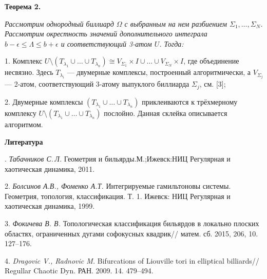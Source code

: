 \textbf{Теорема 2.} {\it
	Рассмотрим однородный биллиард $\Omega$ с выб\-ран\-ным на нем разбиением $\Sigma_1, \ldots, \Sigma_N$. Рассмотрим окрест\-ность значений дополнительного интеграла $b - \epsilon \leq \Lambda \leq b + \epsilon$ и соответствующий 3-атом $U$. Тогда:

1. Комплекс $U \setminus (T_{\lambda_1}\cup\ldots\cup T_{\lambda_n}) \cong V_{\Sigma_1} \times I \cup \ldots \cup V_{\Sigma_N} \times I$, где объединение несвязно. Здесь $T_{\lambda_i}$ --- двумерные комплексы, построенный алгорит\-мически, а $V_{\Sigma_j}$ --- 2-атом, соот\-вет\-ствующий 3-атому выпуклого бил\-лиарда $\Sigma_j$, см. [3];

2. Двумерные комплексы $(T_{\lambda_1} \cup \ldots \cup T_{\lambda_n})$ приклеиваются к трёхмерному комплексу $U \setminus (T_{\lambda_1} \cup \ldots \cup T_{\lambda_n})$ послойно. Данная склейка описывается алгоритмом.}







\smallskip \centerline {\bf Литература} . {\it Табачников С.\,Л.}
Геометрия и бильярды.М.;Ижевск:НИЦ Регулярная и хаотическая динамика, 2011.

2. {\it Болсинов А.В., Фоменко А.Т.}
Интегрируемые гамиль\-тоновы системы. Геометрия, топология, классификация. Т. 1. Ижевск: НИЦ Регулярная и хаотическая динамика, 1999.

3. {\it Фокичева В. В.}
Топологическая классификация бильярдов в локально плоских областях, ограниченных дугами софокусных квадрик//
матем. сб. 2015, 206, 10. 127--176.

4. {\it Dragovic V., Radnovic M.}
Bifurcations of Liouville tori in elliptical billiards//
Regullar Chaotic Dyn. РАН. 2009. 14. 479--494.
